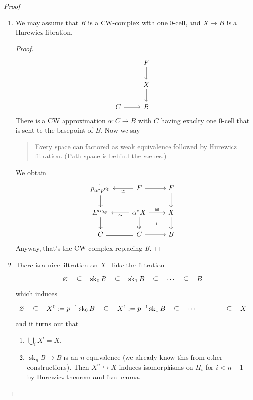 \documentclass{article}
\DeclareMathOperator{\sk}{sk}
\begin{document}
\begin{proof}\leavevmode
	\begin{enumerate}
		\item We may assume that $B$ is a CW-complex with one 0-cell, and $X\to B$ is a Hurewicz fibration.
		\begin{proof}
			\[\begin{tikzcd}
				&F\arrow[d]\\
				&X\arrow[d]\\
				C\arrow[r]&B
			\end{tikzcd}\]
			There is a CW approximation $\alpha:C\to B$ with $C$ having exaclty one 0-cell that is sent to the basepoint of $B$. Now we say
			\begin{quotation}
				Every space can factored as weak equivalence followed by Hurewicz fibration. (Path space is behind the scenes.)
			\end{quotation}
			We obtain
			\[\begin{tikzcd}
				p^{-1}_{\alpha^*p}e_0\arrow[d]&F\arrow[l,"\simeq"]\arrow[r]&F\arrow[d]\\
				E^{\alpha_{0,p}}\arrow[d]&\alpha^*X\arrow[d,two heads]\arrow[dr,phantom,"\lrcorner"]\arrow[l,"\simeq"]\arrow[r,"\cong"]&X\arrow[d]\\
				C\arrow[r,equal]&C\arrow[r]&B
			\end{tikzcd}\]
			Anyway, that's the CW-complex replacing $B$.
		\end{proof}
		\item There is a nice filtration on $X$. Take the filtration
		\[\begin{tikzcd}
			\varnothing\arrow[r,phantom,"\subseteq"]&\sk_0 B\arrow[r,phantom,"\subseteq"]&\sk_1B\arrow[r,phantom,"\subseteq"]&\cdots\arrow[r,phantom,"\subseteq"]&B
		\end{tikzcd}\]
		which induces
		\[\begin{tikzcd}
			\varnothing\arrow[r,phantom,"\subseteq"]&X^0:=p^{-1}\sk_0 B\arrow[r,phantom,"\subseteq"]&X^1:=p^{-1}\sk_1B\arrow[r,phantom,"\subseteq"]&\cdots&\arrow[r,phantom,"\subseteq"]&X
		\end{tikzcd}\]
		and it turns out that
		\begin{enumerate}
			\item $\bigcup_iX^i=X$.
			\item $\sk_nB\to B$ is an $n$-equivalence (we already know this from other constructions). Then $X^n\hookrightarrow X$ induces isomorphisms on $H_i$ for $i<n-1$ by Hurewicz theorem and five-lemma.
			

\end{enumerate}
\end{enumerate}
\end{proof}
\end{document}
